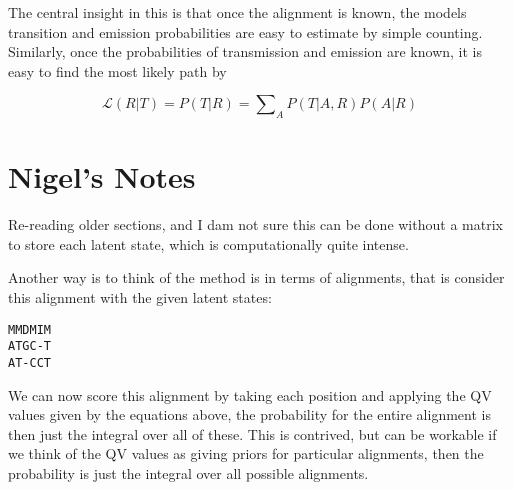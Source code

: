 \documentclass[fleqn,10pt]{SelfArx} %
\begin{document}
The central insight in this is that once the alignment is known, the models transition and emission probabilities are easy to estimate by simple counting.  Similarly, once the probabilities of transmission and emission are known, it is easy to find the most likely path by 

\begin{dmath}
\mathcal{L}  (R|T) = P(T|R) = \sum\nolimits_{A} P(T|A,R)P(A|R)
\end{dmath}
\section{Nigel's Notes}

Re-reading older sections, and I dam not sure this can be done without a matrix to store each latent state, which is computationally quite intense.

Another way is to think of the method is in terms of alignments, that is consider this alignment with the given latent states: 

 \begin{center}
 \texttt{MMDMIM}\\
\texttt{ATGC-T}\\
\texttt{AT-CCT}
\end{center}

We can now score this alignment by taking each position and applying the QV values given by the equations above, the probability for the entire alignment is then just the integral over all of these.  This is contrived, but can be workable if we think of the QV values as giving priors for particular alignments, then the probability is just the integral over all possible alignments.

\end{document}
